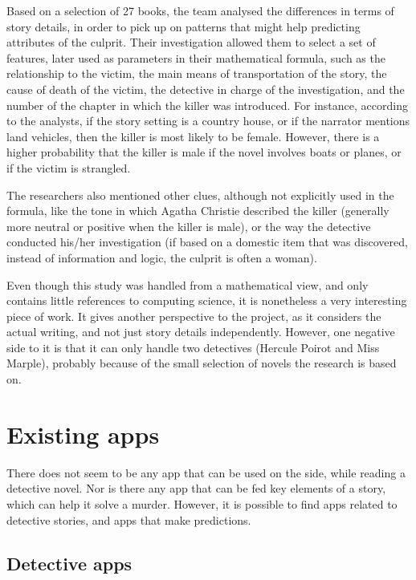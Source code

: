 \documentclass{mproj}
\begin{document}
Based on a selection of 27 books, the team analysed the differences in terms of story details, in order to pick up on patterns that might help predicting attributes of the culprit. Their investigation allowed them to select a set of features, later used as parameters in their mathematical formula, such as the relationship to the victim, the main means of transportation of the story, the cause of death of the victim, the detective in charge of the investigation, and the number of the chapter in which the killer was introduced. For instance, according to the analysts, if the story setting is a country house, or if the narrator mentions land vehicles, then the killer is most likely to be female. However, there is a higher probability that the killer is male if the novel involves boats or planes, or if the victim is strangled. \par

The researchers also mentioned other clues, although not explicitly used in the formula, like the tone in which Agatha Christie described the killer (generally more neutral or positive when the killer is male), or the way the detective conducted his/her investigation (if based on a domestic item that was discovered, instead of information and logic, the culprit is often a woman).  \par

Even though this study was handled from a mathematical view, and only contains little references to computing science, it is nonetheless a very interesting piece of work. It gives another perspective to the project, as it considers the actual writing, and not just story details independently. However, one negative side to it is that it can only handle two detectives (Hercule Poirot and Miss Marple), probably because of the small selection of novels the research is based on.

\section{Existing apps}

There does not seem to be any app that can be used on the side, while reading a detective novel. Nor is there any app that can be fed key elements of a story, which can help it solve a murder. However, it is possible to find apps related to detective stories, and apps that make predictions.

\subsection*{Detective apps}
\end{document}
